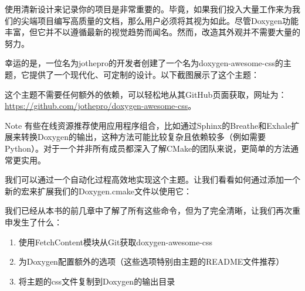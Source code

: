 使用清新设计来记录你的项目是非常重要的。毕竟，如果我们投入大量工作来为我们的尖端项目编写高质量的文档，那么用户必须将其视为如此。尽管Doxygen功能丰富，但它并不以遵循最新的视觉趋势而闻名。然而，改造其外观并不需要大量的努力。

幸运的是，一位名为jothepro的开发者创建了一个名为doxygen-awesome-css的主题，它提供了一个现代化、可定制的设计。以下截图展示了这个主题：


这个主题不需要任何额外的依赖，可以轻松地从其GitHub页面获取，网址为： \url{https://github.com/jothepro/doxygen-awesome-css}。

\begin{myNotic}{Note}
有些在线资源推荐使用应用程序组合，比如通过Sphinx的Breathe和Exhale扩展来转换Doxygen的输出，这种方法可能比较复杂且依赖较多（例如需要Python）。对于一个并非所有成员都深入了解CMake的团队来说，更简单的方法通常更实用。
\end{myNotic}

我们可以通过一个自动化过程高效地实现这个主题。让我们看看如何通过添加一个新的宏来扩展我们的Doxygen.cmake文件以使用它：



我们已经从本书的前几章中了解了所有这些命令，但为了完全清晰，让我们再次重申发生了什么：

\begin{enumerate}
\item
使用FetchContent模块从Git获取doxygen-awesome-css

\item
为Doxygen配置额外的选项（这些选项特别由主题的README文件推荐）

\item
将主题的css文件复制到Doxygen的输出目录
\end{enumerate}

